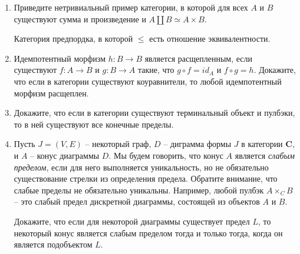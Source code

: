 \documentclass[draft]{article}
\newcommand{\cat}[1]{\mathbf{#1}}
\renewcommand{\C}{\cat{C}}
\begin{document}
\begin{enumerate}
\item Приведите нетривиальный пример категории, в которой для всех $A$ и $B$ существуют сумма и произведение и $A \amalg B \simeq A \times B$.

Категория предпордка, в которой $\leq$ есть отношение эквивалентности.

\item Идемпотентный морфизм $h : B \to B$ является расщепленным, если существуют $f : A \to B$ и $g : B \to A$ такие, что $g \circ f = id_A$ и $f \circ g = h$.
Докажите, что если в категории существуют коуравнители, то любой идемпотентный морфизм расщеплен.

\item Докажите, что если в категории существуют терминальный объект и пулбэки, то в ней существуют все конечные пределы.

\item Пусть $J = (V,E)$ -- некоторый граф, $D$ -- диграмма формы $J$ в категории $\C$, и $A$ -- конус диаграммы $D$.
Мы будем говорить, что конус $A$ является \emph{слабым пределом}, если для него выполняется уникальность, но не обязательно существование стрелки из определения предела.
Обратите внимание, что слабые пределы не обязательно уникальны.
Например, любой пулбэк $A \times_C B$ -- это слабый предел дискретной диаграммы, состоящей из объектов $A$ и $B$.

Докажите, что если для некоторой диаграммы существует предел $L$, то некоторый конус является слабым пределом тогда и только тогда, когда он является подобъектом $L$.

\end{enumerate}
\end{document}
